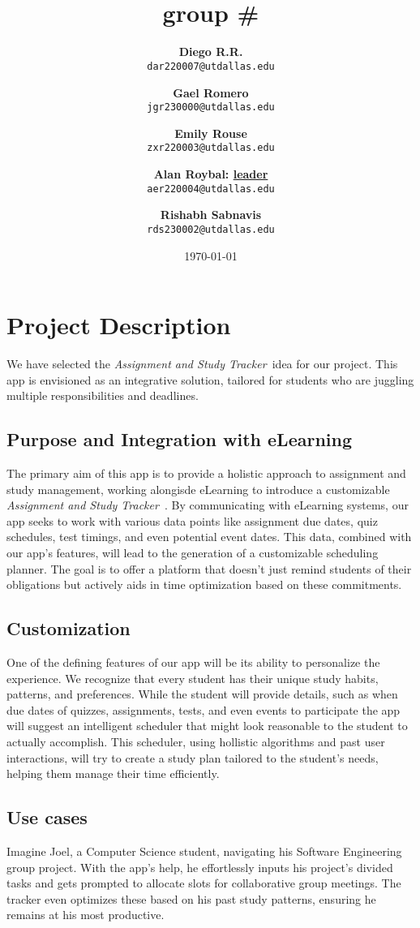 \documentclass[12pt]{article}
\title{\groupname
\\ \small{group} \# \groupnumber}
\author{
    \textbf{Diego R.R.} \\
    \texttt{dar220007@utdallas.edu} \\
    \and 
    \textbf{Gael Romero} \\
    \texttt{jgr230000@utdallas.edu} \\
    \and
    \textbf{Emily Rouse} \\
    \texttt{zxr220003@utdallas.edu} \\
    \and
    \textbf{Alan Roybal: \underline{leader}} \\
    \texttt{aer220004@utdallas.edu} \\
    \and
    \textbf{Rishabh Sabnavis} \\
    \texttt{rds230002@utdallas.edu}
}
\date{\today} %
\newcommand\projectname{\textit{Assignment and Study Tracker\ }}
\begin{document}
\maketitle %

\section{Project Description} 
    We have selected the \projectname idea for our project. This app is envisioned as an integrative solution, tailored for students who are juggling multiple responsibilities and deadlines.

\subsection{Purpose and Integration with eLearning}
    The primary aim of this app is to provide a holistic approach to assignment and study management, working alongisde eLearning to introduce a customizable \projectname. By communicating with eLearning systems, our app seeks to work with various data points like assignment due dates, quiz schedules, test timings, and even potential event dates. This data, combined with our app's features, will lead to the generation of a customizable scheduling planner. The goal is to offer a platform that doesn't just remind students of their obligations but actively aids in time optimization based on these commitments.

\subsection{Customization} 
    One of the defining features of our app will be its ability to personalize the experience. We recognize that every student has their unique study habits, patterns, and preferences. While the student will provide details, such as when due dates of quizzes, assignments, tests, and even events to participate the app will suggest an intelligent scheduler that might look reasonable to the student to actually accomplish. This scheduler, using hollistic algorithms and past user interactions, will try to create a study plan tailored to the student's needs, helping them manage their time efficiently.

\subsection{Use cases}
    Imagine Joel, a Computer Science student, navigating his Software Engineering group project. With the app's help, he effortlessly inputs his project's divided tasks and gets prompted to allocate slots for collaborative group meetings. The tracker even optimizes these based on his past study patterns, ensuring he remains at his most productive. 
\end{document}
